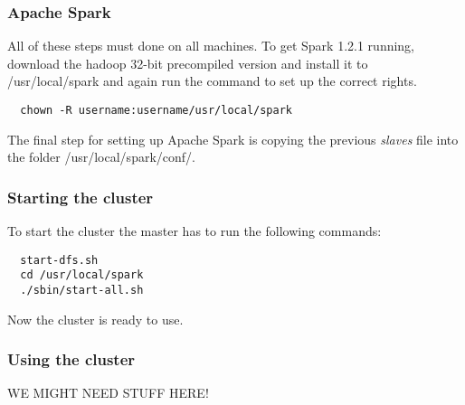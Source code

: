\subsubsection*{Apache Spark}
All of these steps must done on all machines. To get Spark 1.2.1 running, download the hadoop 32-bit precompiled version and install it to \textsf{/usr/local/spark} and again run the command to set up the correct rights.
\begin{lstlisting}
  chown -R username:username/usr/local/spark
\end{lstlisting}
The final step for setting up Apache Spark is copying the previous \emph{slaves} file into the folder \textsf{/usr/local/spark/conf/}.


\subsubsection*{Starting the cluster}
To start the cluster the master has to run the following commands:
\begin{lstlisting}
  start-dfs.sh
  cd /usr/local/spark
  ./sbin/start-all.sh
\end{lstlisting}
Now the cluster is ready to use.

\subsubsection*{Using the cluster}
WE MIGHT NEED STUFF HERE!

